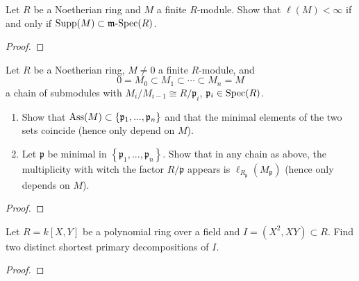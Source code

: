 \newpage
\begin{problem}
Let $R$ be a Noetherian ring and $M$ a finite $R$-module. Show
that $\ell(M)<\infty$ if and only  if
$\operatorname{Supp}(M)\subset\operatorname{\mathfrak{m}-Spec}(R)$.
\end{problem}
\begin{proof}
\end{proof}
\newpage
\begin{problem}
Let $R$ be a Noetherian ring, $M\neq 0$ a finite $R$-module, and
\[
0=M_0\subset M_1\subset \cdots\subset M_n=M
\]
a chain of submodules with $M_i/M_{i-1}\cong R/\mathfrak{p}_i$,
$\mathfrak{p}_i\in\operatorname{Spec}(R)$.
\begin{enumerate}[label=(\alph*)]
\item Show that
  $\operatorname{Ass}(M)\subset\left\{\mathfrak{p}_1,...,\mathfrak{p}_n\right\}$
  and that the minimal elements of the two sets coincide (hence
  only depend on $M$).
\item Let $\mathfrak{p}$ be minimal in
  $\left\{\mathfrak{p}_1,...,\mathfrak{p}_n\right\}$. Show that
  in any chain as above, the multiplicity with witch the factor
  $R/\mathfrak{p}$ appears is
  $\ell_{R_{\mathfrak{p}}}(M_{\mathfrak{p}})$ (hence only depends
  on $M$).
\end{enumerate}
\end{problem}
\begin{proof}
\end{proof}
\newpage
\begin{problem}
Let $R=k[X,Y]$ be a polynomial ring over a field and
$I=(X^2,XY)\subset R$. Find two distinct shortest primary
decompositions of $I$.
\end{problem}
\begin{proof}
\end{proof}


